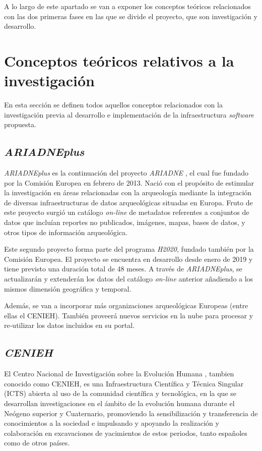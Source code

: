 
A lo largo de este apartado se van a exponer los conceptos teóricos
relacionados con las dos primeras fases en las que se divide el
proyecto, que son investigación y desarrollo.

\section{Conceptos teóricos relativos a la investigación}

En esta sección se definen todos aquellos conceptos relacionados con la
investigación previa al desarrollo e implementación de la
infraestructura \emph{software} propuesta.

\subsection{\emph{ARIADNEplus}}

\emph{ARIADNEplus} \cite{arip:web} es la continuación del
proyecto \emph{ARIADNE} \cite{ari:web}, el cual fue fundado
por la Comisión Europea en febrero de 2013. Nació con el propósito de
estimular la investigación en áreas relacionadas con la arqueología
mediante la integración de diversas infraestructuras de datos
arqueológicas situadas en Europa. Fruto de este proyecto surgió un
catálogo \emph{on-line} de metadatos referentes a conjuntos de datos
que incluían reportes no publicados, imágenes, mapas, bases de datos, y
otros tipos de información arqueológica.

Este segundo proyecto forma parte del programa \emph{H2020}, fundado
también por la Comisión Europea. El proyecto se encuentra en desarrollo
desde enero de 2019 y tiene previsto una duración total de 48 meses. A
través de \emph{ARIADNEplus}, se actualizarán y extenderán los datos del
catálogo \emph{on-line} anterior añadiendo a los mismos dimensión
geográfica y temporal. 

Además, se van a incorporar más organizaciones
arqueológicas Europeas (entre ellas el CENIEH). También proveerá nuevos
servicios en la nube para procesar y re-utilizar los datos incluidos en
su portal.

\subsection{\emph{CENIEH}}

El Centro Nacional de Investigación sobre la Evolución
Humana \cite{cenieh:web}, tambien conocido como
CENIEH, es una Infraestructura Científica y Técnica Singular (ICTS)
abierta al uso de la comunidad científica y tecnológica, en la que se
desarrollan investigaciones en el ámbito de la evolución humana durante
el Neógeno superior y Cuaternario, promoviendo la sensibilización y
transferencia de conocimientos a la sociedad e impulsando y apoyando la
realización y colaboración en excavaciones de yacimientos de estos
periodos, tanto españoles como de otros países.

